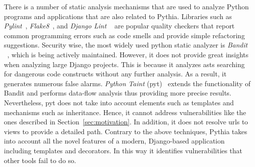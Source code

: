 There is a number of static analysis
mechanisms that are used to analyze Python
programs and applications that are
also related to Pythia.
Libraries such as
{\it Pylint}~\cite{pylint},
{\it Flake8}~\cite{py_flake},
and {\it Django Lint} ~\cite{django_lint}
are popular quality checkers that report
common programming errors such as code
smells and provide simple refactoring
suggestions.
Security wise,
the most widely used
python static analyzer is
{\it Bandit} ~\cite{bandit},
which is being actively maintained.
However,
it does not provide great insights
when analyzing large Django projects.
This is because it analyzes {\sc ast}s 
searching for dangerous code
constructs without any further analysis.
As a result,
it generates numerous false alarms.
{\it Python Taint}
({\sc pyt})~\cite{pyt} extends the
functionality of Bandit and performs
data-flow analysis thus providing more
precise results.
Nevertheless,
{\sc pyt} does not take into account
elements such as templates and
mechanisms such as inheritance.
Hence,
it cannot address vulnerabilities
like the ones described in
Section~\ref{sec:motivation}.
In addition,
it does not resolve {\sc url}s
to views to provide a detailed path.
Contrary to the above techniques,
Pythia takes into account all the
novel features of a modern,
Django-based application including
templates and decorators.
In this way it identifies vulnerabilities
that other tools fail to do so.



